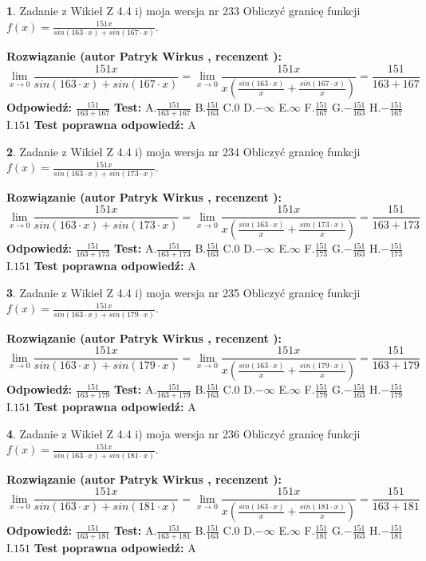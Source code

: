\documentclass[12pt, a4paper]{article}
\theoremstyle{definition} %
\newtheorem{zad}{}
\newcommand{\zadStart}[1]{\begin{zad}#1\newline}
\newcommand{\zadStop}{\end{zad}}
\newcommand{\rozwStart}[2]{\noindent \textbf{Rozwiązanie (autor #1 , recenzent #2): }\newline}
\newcommand{\rozwStop}{\newline}
\newcommand{\odpStart}{\noindent \textbf{Odpowiedź:}\newline}
\newcommand{\odpStop}{\newline}
\newcommand{\testStart}{\noindent \textbf{Test:}\newline}
\newcommand{\testStop}{\newline}
\newcommand{\kluczStart}{\noindent \textbf{Test poprawna odpowiedź:}\newline}
\newcommand{\kluczStop}{\newline}
\begin{document}
\zadStart{Zadanie z Wikieł Z 4.4 i) moja wersja nr 233}
Obliczyć granicę funkcji $f(x)=\frac{151x}{sin(163\cdot x) +sin(167\cdot x)}$.
\zadStop
\rozwStart{Patryk Wirkus}{}
$$\lim\limits_{x\to 0}\frac{151x}{sin(163\cdot x) +sin(167\cdot x)}=\lim\limits_{x\to 0}\frac{151x}{x(\frac{sin(163\cdot x)}{x}+\frac{sin(167\cdot x)}{x})}=\frac{151}{163+167}$$
\rozwStop
\odpStart
$\frac{151}{163+167}$
\odpStop
\testStart
A.$\frac{151}{163+167}$
B.$\frac{151}{163}$
C.$0$
D.$-\infty$
E.$\infty$
F.$\frac{151}{167}$
G.$-\frac{151}{163}$
H.$-\frac{151}{167}$
I.$151$
\testStop
\kluczStart
A
\kluczStop



\zadStart{Zadanie z Wikieł Z 4.4 i) moja wersja nr 234}
Obliczyć granicę funkcji $f(x)=\frac{151x}{sin(163\cdot x) +sin(173\cdot x)}$.
\zadStop
\rozwStart{Patryk Wirkus}{}
$$\lim\limits_{x\to 0}\frac{151x}{sin(163\cdot x) +sin(173\cdot x)}=\lim\limits_{x\to 0}\frac{151x}{x(\frac{sin(163\cdot x)}{x}+\frac{sin(173\cdot x)}{x})}=\frac{151}{163+173}$$
\rozwStop
\odpStart
$\frac{151}{163+173}$
\odpStop
\testStart
A.$\frac{151}{163+173}$
B.$\frac{151}{163}$
C.$0$
D.$-\infty$
E.$\infty$
F.$\frac{151}{173}$
G.$-\frac{151}{163}$
H.$-\frac{151}{173}$
I.$151$
\testStop
\kluczStart
A
\kluczStop



\zadStart{Zadanie z Wikieł Z 4.4 i) moja wersja nr 235}
Obliczyć granicę funkcji $f(x)=\frac{151x}{sin(163\cdot x) +sin(179\cdot x)}$.
\zadStop
\rozwStart{Patryk Wirkus}{}
$$\lim\limits_{x\to 0}\frac{151x}{sin(163\cdot x) +sin(179\cdot x)}=\lim\limits_{x\to 0}\frac{151x}{x(\frac{sin(163\cdot x)}{x}+\frac{sin(179\cdot x)}{x})}=\frac{151}{163+179}$$
\rozwStop
\odpStart
$\frac{151}{163+179}$
\odpStop
\testStart
A.$\frac{151}{163+179}$
B.$\frac{151}{163}$
C.$0$
D.$-\infty$
E.$\infty$
F.$\frac{151}{179}$
G.$-\frac{151}{163}$
H.$-\frac{151}{179}$
I.$151$
\testStop
\kluczStart
A
\kluczStop



\zadStart{Zadanie z Wikieł Z 4.4 i) moja wersja nr 236}
Obliczyć granicę funkcji $f(x)=\frac{151x}{sin(163\cdot x) +sin(181\cdot x)}$.
\zadStop
\rozwStart{Patryk Wirkus}{}
$$\lim\limits_{x\to 0}\frac{151x}{sin(163\cdot x) +sin(181\cdot x)}=\lim\limits_{x\to 0}\frac{151x}{x(\frac{sin(163\cdot x)}{x}+\frac{sin(181\cdot x)}{x})}=\frac{151}{163+181}$$
\rozwStop
\odpStart
$\frac{151}{163+181}$
\odpStop
\testStart
A.$\frac{151}{163+181}$
B.$\frac{151}{163}$
C.$0$
D.$-\infty$
E.$\infty$
F.$\frac{151}{181}$
G.$-\frac{151}{163}$
H.$-\frac{151}{181}$
I.$151$
\testStop
\kluczStart
A
\kluczStop
\end{document}

